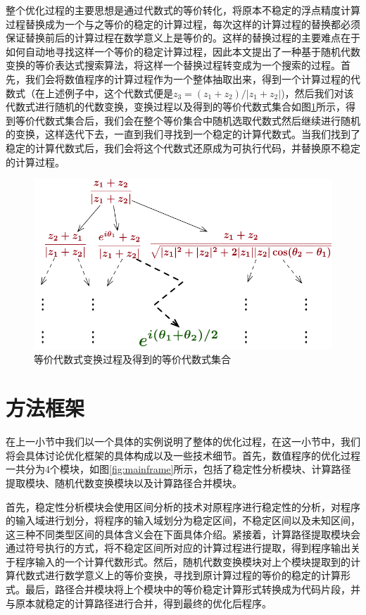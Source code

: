 整个优化过程的主要思想是通过代数式的等价转化，将原本不稳定的浮点精度计算过程替换成为一个与之等价的稳定的计算过程，每次这样的计算过程的替换都必须保证替换前后的计算过程在数学意义上是等价的。这样的替换过程的主要难点在于如何自动地寻找这样一个等价的稳定计算过程，因此本文提出了一种基于随机代数变换的等价表达式搜索算法，将这样一个替换过程转变成为一个搜索的过程。首先，我们会将数值程序的计算过程作为一个整体抽取出来，得到一个计算过程的代数式（在上述例子中，这个代数式便是$z_3=(z_1+z_2)/|z_1+z_2|$)，然后我们对该代数式进行随机的代数变换，变换过程以及得到的等价代数式集合如图\ref{fig:eqspace}所示，得到等价代数式集合后，我们会在整个等价集合中随机选取代数式然后继续进行随机的变换，这样迭代下去，一直到我们寻找到一个稳定的计算代数式。当我们找到了稳定的计算代数式后，我们会将这个代数式还原成为可执行代码，并替换原不稳定的计算过程。

\begin{figure}[thb]
  \centering
  \vspace*{1mm}
  \includegraphics[width=120mm]{fig/EquivalentSpace.pdf}
  \vspace*{1mm}
  \caption{等价代数式变换过程及得到的等价代数式集合} \label{fig:eqspace} %
\end{figure}

\section{方法框架}

在上一小节中我们以一个具体的实例说明了整体的优化过程，在这一小节中，我们将会具体讨论优化框架的具体构成以及一些技术细节。首先，数值程序的优化过程一共分为4个模块，如图\ref{fig:mainframe}所示，包括了稳定性分析模块、计算路径提取模块、随机代数变换模块以及计算路径合并模块。

首先，稳定性分析模块会使用区间分析的技术对原程序进行稳定性的分析，对程序的输入域进行划分，将程序的输入域划分为稳定区间，不稳定区间以及未知区间，这三种不同类型区间的具体含义会在下面具体介绍。紧接着，计算路径提取模块会通过符号执行的方式，将不稳定区间所对应的计算过程进行提取，得到程序输出关于程序输入的一个计算代数形式。然后，随机代数变换模块对上个模块提取到的计算代数式进行数学意义上的等价变换，寻找到原计算过程的等价的稳定的计算形式。最后，路径合并模块将上个模块中的等价稳定计算形式转换成为代码片段，并与原本就稳定的计算路径进行合并，得到最终的优化后程序。

